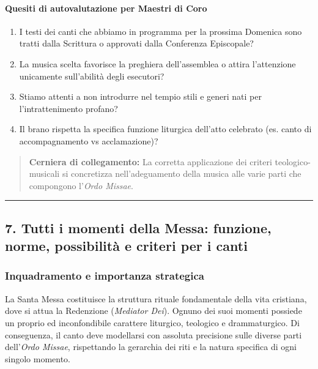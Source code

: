 \documentclass[12pt,a4paper]{article}
\begin{document}
	\paragraph{Quesiti di autovalutazione per Maestri di Coro}\label{quesiti-di-autovalutazione-per-maestri-di-coro}
	
	\begin{enumerate}[label=\arabic*.,leftmargin=*]
		\item I testi dei canti che abbiamo in programma per la prossima Domenica sono tratti dalla Scrittura o approvati dalla Conferenza Episcopale?
		\item La musica scelta favorisce la preghiera dell'assemblea o attira l'attenzione unicamente sull'abilità degli esecutori?
		\item Stiamo attenti a non introdurre nel tempio stili e generi nati per l'intrattenimento profano?
		\item Il brano rispetta la specifica funzione liturgica dell'atto celebrato (es. canto di accompagnamento vs acclamazione)?
	\end{enumerate}
	
	\begin{quote}
		\textbf{Cerniera di collegamento:} La corretta applicazione dei criteri teologico-musicali si concretizza nell'adeguamento della musica alle varie parti che compongono l'\emph{Ordo Missae}.
	\end{quote}
	
	\begin{center}\rule{0.5\linewidth}{0.5pt}\end{center}
	
	\subsection{7. Tutti i momenti della Messa: funzione, norme, possibilità e criteri per i canti}\label{tutti-i-momenti-della-messa-funzione-norme-possibilita-e-criteri-per-i-canti}
	
	\subsubsection{Inquadramento e importanza strategica}\label{inquadramento-e-importanza-strategica-6}
	
	La Santa Messa costituisce la struttura rituale fondamentale della vita cristiana, dove si attua la Redenzione (\emph{Mediator Dei}). Ognuno dei suoi momenti possiede un proprio ed inconfondibile carattere liturgico, teologico e drammaturgico. Di conseguenza, il canto deve modellarsi con assoluta precisione sulle diverse parti dell'\emph{Ordo Missae}, rispettando la gerarchia dei riti e la natura specifica di ogni singolo momento.
	
\end{document}
